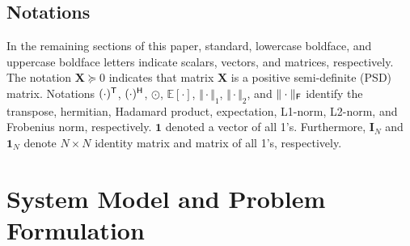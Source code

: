 \documentclass[draftclsnofoot, onecolumn, comsoc, 12pt]{IEEEtran}
\begin{document}
\begin{itemize}
\end{itemize}

\subsection{Notations}    
In the remaining sections of this paper, standard, lowercase boldface, and uppercase boldface letters indicate scalars, vectors, and matrices, respectively. 
The notation $\mathbf{X} \succcurlyeq 0$ indicates that matrix $\mathbf{X}$ is a positive semi-definite (PSD) matrix. 
Notations $(\cdot)^{\sf{T}}$, $(\cdot)^{\sf{H}}$, $\odot$, $\mathbb{E}[\cdot]$, $\Vert \cdot \Vert_{1}$, $\Vert \cdot \Vert_{2}$, and $\Vert \cdot \Vert_{\sf{F}}$ identify the transpose, hermitian, Hadamard product, expectation, L1-norm, L2-norm, and Frobenius norm, respectively. 
$\mathbf{1}$ denoted a vector of all 1's. 
Furthermore, $\mathbf{I}_{N}$ and $\mathbf{1}_{N}$ denote $N \times N$ identity matrix and matrix of all 1's, respectively. 


\section{System Model and Problem Formulation}
\end{document}

